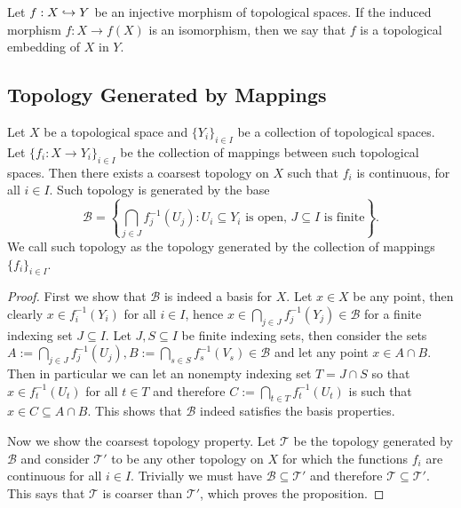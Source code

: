 \begin{definition}[Embedding]\label{def:top-embedding}
Let \(f: X \hookrightarrow Y\) be an injective morphism of topological spaces. If the
induced morphism \(f: X \to f(X)\) is an isomorphism, then we say that \(f\) is a
topological embedding of \(X\) in \(Y\).
\end{definition}

\subsection{Topology Generated by Mappings}

\begin{proposition}
\label{prop: top generated by collection of maps}
Let \(X\) be a topological space and \(\{Y_i\}_{i \in I}\) be a collection of
topological spaces. Let \(\{f_i : X \to Y_i\}_{i \in I}\) be the collection of
mappings between such topological spaces. Then there exists a coarsest
topology on \(X\) such that \(f_i\) is continuous, for all \(i \in I\). Such
topology is generated by the base
\[
  \mathcal B = \left\{ \bigcap_{j \in J} f_j^{-1}(U_j) : U_i \subseteq Y_i
  \text{ is open, } J \subseteq I \text{ is finite}\right\}.
\]
We call such topology as the topology generated by the collection of mappings
\(\{f_i\}_{i \in I}\).
\end{proposition}

\begin{proof}
First we show that \(\mathcal B\) is indeed a basis for \(X\). Let \(x \in X\)
be any point, then clearly \(x \in f_i^{-1}(Y_i)\) for all \(i \in I\), hence
\(x \in \bigcap_{j \in  J} f_j^{-1}(Y_j) \in \mathcal B\) for a finite
indexing set \(J \subseteq I\).
Let \(J, S \subseteq I\) be finite indexing sets, then consider the sets
\(A := \bigcap_{j \in J} f_j^{-1}(U_j), B := \bigcap_{s \in S} f_s^{-1}(V_s) \in
\mathcal B\) and let any point \(x \in A \cap B\). Then in particular we can
let an nonempty indexing set \(T = J \cap S\) so that \(x \in f_t^{-1}(U_t)\)
for all \(t \in T\) and therefore \(C := \bigcap_{t \in  T} f_t^{-1}(U_t)\) is
such that \(x \in C \subseteq A \cap B\). This shows that \(\mathcal B\)
indeed satisfies the basis properties.

Now we show the coarsest topology property. Let \(\mathcal T\) be the topology
generated by \(\mathcal B\) and consider \(\mathcal T'\) to be any other
topology on \(X\) for which the functions \(f_i\) are continuous for all \(i
\in I\). Trivially we must have \(\mathcal B \subseteq \mathcal T'\) and
therefore \(\mathcal T \subseteq \mathcal T'\). This says that \(\mathcal T\)
is coarser than \(\mathcal T'\), which proves the proposition.
\end{proof}

